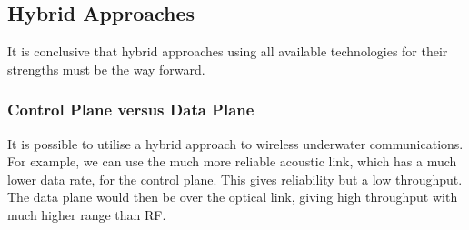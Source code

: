 \subsection{Hybrid Approaches}
It is conclusive that hybrid approaches using all available technologies
for their strengths must be the way forward.

\subsubsection{Control Plane versus Data Plane}
It is possible to utilise a hybrid approach to wireless underwater
communications. For example, we can use the much more reliable
acoustic link, which has a much lower data rate, for the control
plane. This gives reliability but a low throughput. The data plane
would then be over the optical link, giving high throughput with
much higher range than \ac{RF}.